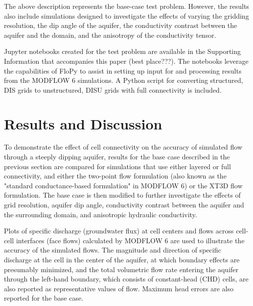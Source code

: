 \documentclass{article}
\begin{document}
The above description represents the base-case test problem. However, the results also include simulations designed to investigate the effects of varying the gridding resolution, the dip angle of the aquifer, the conductivity contrast between the aquifer and the domain, and the anisotropy of the conductivity tensor.

Jupyter notebooks created for the test problem are available in the Supporting Information that accompanies this paper {\color{red} (best place???)}. The notebooks leverage the capabilities of FloPy \citep{bakker2016scripting, hughes2023flopy} to assist in setting up input for and processing results from the MODFLOW 6 simulations. A Python script for converting structured, DIS grids to unstructured, DISU grids with full connectivity is included.

\section{Results and Discussion}

To demonstrate the effect of cell connectivity on the accuracy of simulated flow through a steeply dipping aquifer, results for the base case described in the previous section are compared for simulations that use either layered or full connectivity, and either the two-point flow formulation (also known as the "standard conductance-based formulation" in MODFLOW 6) or the XT3D flow formulation. The base case is then modified to further investigate the effects of grid resolution, aquifer dip angle, conductivity contrast between the aquifer and the surrounding domain, and anisotropic hydraulic conductivity.

Plots of specific discharge (groundwater flux) at cell centers and flows across cell-cell interfaces (face flows) calculated by MODFLOW 6 are used to illustrate the accuracy of the simulated flows. The magnitude and direction of specific discharge at the cell in the center of the aquifer, at which boundary effects are presumably minimized, and the total volumetric flow rate entering the aquifer through the left-hand boundary, which consists of constant-head (CHD) cells, are also reported as representative values of flow. Maximum head errors are also reported for the base case.
\end{document}
